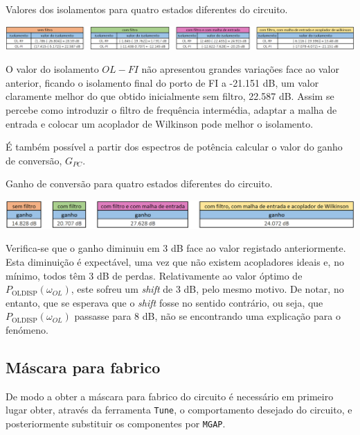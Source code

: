\documentclass[11pt]{article}
\numberwithin{equation}{section}
\begin{document}
\begin{table}[h]
	\centering
	\caption{Valores dos isolamentos para quatro estados diferentes do circuito.}
	\vspace{-1.5mm}
	\includegraphics[keepaspectratio=true, scale=0.34]{teoricas/isolamentosSemComFiltroMalhaAcop}
\end{table}

O valor do isolamento $OL - FI$ não apresentou grandes variações face ao valor anterior, ficando o isolamento final do porto de FI a -21.151 dB, um valor claramente melhor do que obtido inicialmente sem filtro, 22.587 dB. Assim se percebe como introduzir o filtro de frequência intermédia, adaptar a malha de entrada e colocar um acoplador de Wilkinson pode melhor o isolamento.

É também possível a partir dos espectros de potência calcular o valor do ganho de conversão, $G_{PC}$.

\begin{table}[h]
	\centering
	\caption{Ganho de conversão para quatro estados diferentes do circuito.}
	\vspace{-1.5mm}
	\includegraphics[keepaspectratio=true, scale=0.40]{teoricas/ganhoSemComFiltroMalhaAcop}
\end{table}

Verifica-se que o ganho diminuiu em 3 dB face ao valor registado anteriormente. Esta diminuição é expectável, uma vez que não existem acopladores ideais e, no mínimo, todos têm 3 dB de perdas. Relativamente ao valor óptimo de $ P_{\text{OLDISP}}\left(\omega_{OL}\right) $, este sofreu um \textit{shift} de 3 dB, pelo mesmo motivo. De notar, no entanto, que se esperava que o \textit{shift} fosse no sentido contrário, ou seja, que $ P_{\text{OLDISP}}\left(\omega_{OL}\right) $ passasse para 8 dB, não se encontrando uma explicação para o fenómeno. 

\subsection{Máscara para fabrico}

De modo a obter a máscara para fabrico do circuito é necessário em primeiro lugar obter, através da ferramenta \texttt{Tune}, o comportamento desejado do circuito, e posteriormente substituir os componentes por \texttt{MGAP}.
\end{document}
